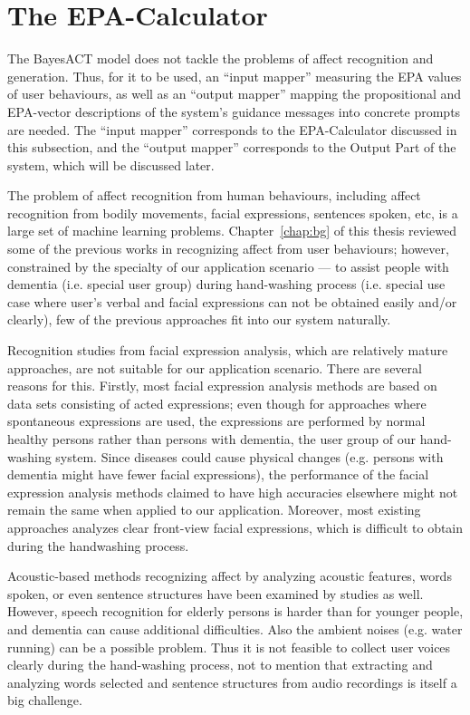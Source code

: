 \section{The EPA-Calculator}

The BayesACT model does not tackle the problems of affect recognition and generation. Thus, for it to be used, an ``input mapper'' measuring the EPA values of user behaviours, as well as an ``output mapper'' mapping the propositional and EPA-vector descriptions of the system's guidance messages into concrete prompts are needed. The ``input mapper'' corresponds to the EPA-Calculator discussed in this subsection, and the ``output mapper'' corresponds to the Output Part of the system, which will be discussed later.

The problem of affect recognition from human behaviours, including affect recognition from bodily movements, facial expressions, sentences spoken, etc, is a large set of machine learning problems. Chapter~\ref{chap:bg} of this thesis reviewed some of the previous works in recognizing affect from user behaviours; however, constrained by the specialty of our application scenario --- to assist people with dementia (i.e. special user group) during hand-washing process (i.e. special use case where user's verbal and facial expressions can not be obtained easily and/or clearly), few of the previous approaches fit into our system naturally.

Recognition studies from facial expression analysis, which are relatively mature approaches, are not suitable for our application scenario. There are several reasons for this. Firstly, most facial expression analysis methods are based on data sets consisting of acted expressions; even though for approaches where spontaneous expressions are used, the expressions are performed by normal healthy persons rather than persons with dementia, the user group of our hand-washing system. Since diseases could cause physical changes (e.g. persons with dementia might have fewer facial expressions), the performance of the facial expression analysis methods claimed to have high accuracies elsewhere might not remain the same when applied to our application. Moreover, most existing approaches analyzes clear front-view facial expressions, which is difficult to obtain during the handwashing process. 

Acoustic-based methods recognizing affect by analyzing acoustic features, words spoken, or even sentence structures have been examined by studies as well. However, speech recognition for elderly persons is harder than for younger people, and dementia can cause additional difficulties. Also the ambient noises (e.g. water running) can be a possible problem. Thus it is not feasible to collect user voices clearly during the hand-washing process, not to mention that extracting and analyzing words selected and sentence structures from audio recordings is itself a big challenge. 

